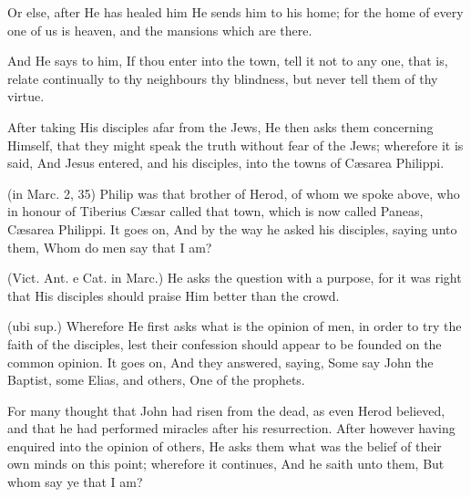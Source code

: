  Or else, after He has healed him He sends him to his home; for the home of every one of us is heaven, and the mansions which are there.

 And He says to him, If thou enter into the town, tell it not to any one, that is, relate continually to thy neighbours thy blindness, but never tell them of thy virtue.

 

 After taking His disciples afar from the Jews, He then asks them concerning Himself, that they might speak the truth without fear of the Jews; wherefore it is said, And Jesus entered, and his disciples, into the towns of Cæsarea Philippi.

 (in Marc. 2, 35) Philip was that brother of Herod, of whom we spoke above, who in honour of Tiberius Cæsar called that town, which is now called Paneas, Cæsarea Philippi. It goes on, And by the way he asked his disciples, saying unto them, Whom do men say that I am?

 (Vict. Ant. e Cat. in Marc.) He asks the question with a purpose, for it was right that His disciples should praise Him better than the crowd.

 (ubi sup.) Wherefore He first asks what is the opinion of men, in order to try the faith of the disciples, lest their confession should appear to be founded on the common opinion. It goes on, And they answered, saying, Some say John the Baptist, some Elias, and others, One of the prophets.

 For many thought that John had risen from the dead, as even Herod believed, and that he had performed miracles after his resurrection. After however having enquired into the opinion of others, He asks them what was the belief of their own minds on this point; wherefore it continues, And he saith unto them, But whom say ye that I am?


